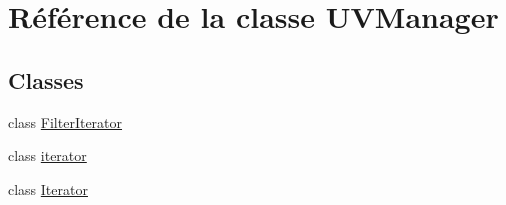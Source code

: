 \hypertarget{class_u_v_manager}{\section{Référence de la classe U\+V\+Manager}
\label{class_u_v_manager}
}
\subsection*{Classes}
\begin{DoxyCompactItemize}
\item 
class \hyperlink{class_u_v_manager_1_1_filter_iterator}{Filter\+Iterator}
\item 
class \hyperlink{class_u_v_manager_1_1iterator}{iterator}
\item 
class \hyperlink{class_u_v_manager_1_1_iterator}{Iterator}
\end{DoxyCompactItemize}
